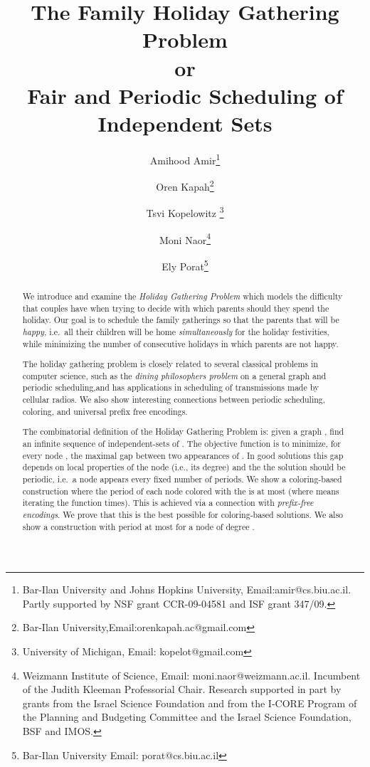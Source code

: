 \documentclass[11pt]{article}
\begin{document}
\title{The Family Holiday Gathering Problem\\ or\\ Fair and Periodic Scheduling of Independent Sets }
\author{
Amihood Amir\thanks{Bar-Ilan University and Johns Hopkins University,
  Email:amir@cs.biu.ac.il. Partly
  supported by  NSF grant CCR-09-04581 and ISF grant 347/09.}\and
Oren Kapah\thanks{Bar-Ilan University,Email:orenkapah.ac@gmail.com}\and
Tsvi Kopelowitz \thanks{University of Michigan, Email: kopelot@gmail.com}\and
Moni Naor\thanks{Weizmann Institute of Science, Email: moni.naor@weizmann.ac.il. Incumbent of the Judith
        Kleeman Professorial Chair. Research supported in part by  grants from the
        Israel Science Foundation and from the
I-CORE Program of the Planning and Budgeting Committee and the Israel Science Foundation, BSF and IMOS.}\and
Ely Porat\thanks{Bar-Ilan University Email: porat@cs.biu.ac.il} }


\date{}

\maketitle

\thispagestyle{empty}
\setcounter{page}{0}

\begin{abstract}

We introduce and examine the {\em Holiday Gathering Problem} which
models the difficulty that couples have when trying to decide with which parents should they spend the holiday.  Our goal is to
schedule the family gatherings so that the parents that will be {\em happy}, i.e.\ all
their children will be home {\em simultaneously} for the holiday festivities, while minimizing the number of consecutive holidays in which parents are not happy.

The holiday gathering problem is closely related to several classical problems in computer science, such as the {\em dining philosophers problem} on a general graph and periodic scheduling,and has applications in scheduling of transmissions made by cellular radios. We also show interesting connections between periodic scheduling, coloring, and universal prefix free encodings.

The combinatorial definition of the Holiday Gathering Problem is: given a graph , find an infinite sequence of independent-sets of . The objective function is to minimize, for every node , the maximal gap between two appearances of .
In good solutions this gap depends on local properties of the node (i.e., its degree) and the the solution should be periodic, i.e.\ a node appears every fixed number of periods. We show a coloring-based construction where the period of each node colored with the  is at most  (where
 means iterating the  function  times). This is achieved via a connection with {\it prefix-free encodings}. We prove that this is the best possible for coloring-based solutions. We also show a construction with period at most  for a node of degree .





\end{abstract}
\end{document}
